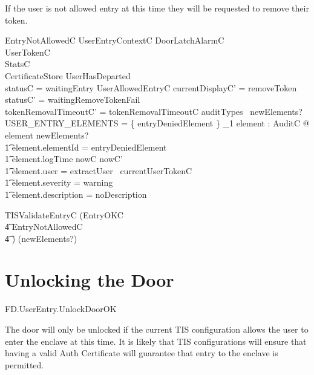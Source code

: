 If the user is not allowed entry at this time they will be
requested to remove their token.

\begin{schema}{EntryNotAllowedC}
        UserEntryContextC
\also
        \Xi DoorLatchAlarmC
\\      \Xi UserTokenC
\\      \Xi StatsC      
\\      \Xi CertificateStore
\where
        \lnot UserHasDeparted
\\        statusC = waitingEntry
\also
        \lnot UserAllowedEntryC
\also
        currentDisplayC' = removeToken
\\      statusC' = waitingRemoveTokenFail
\\      tokenRemovalTimeoutC' = tokenRemovalTimeoutC
\also
        auditTypes~ newElements? \cap USER\_ENTRY\_ELEMENTS = 
        \{ entryDeniedElement \} 
\also
        \exists_1 element : AuditC @ element \in newElements? 
\\ \t1  \land element.elementId = entryDeniedElement
\\ \t1  \land element.logTime \in nowC \upto nowC'
\\ \t1  \land element.user = extractUser~ currentUserTokenC
\\ \t1  \land element.severity = warning
\\ \t1  \land element.description = noDescription

\end{schema}

\begin{zed}
        TISValidateEntryC  (EntryOKC
\\ \t4          \lor EntryNotAllowedC
\\ \t4          \lor [~ UserTokenTornC | statusC = waitingEntry ~])
\hide (newElements?) 
\end{zed}


\section{Unlocking the Door}

\begin{traceunit}{FD.UserEntry.UnlockDoorOK}
\end{traceunit}


The door will only be unlocked if the current TIS configuration allows
the user to enter the enclave at this time. It is likely that TIS
configurations will ensure that having a valid Auth Certificate will
guarantee that entry to the enclave is permitted. 

